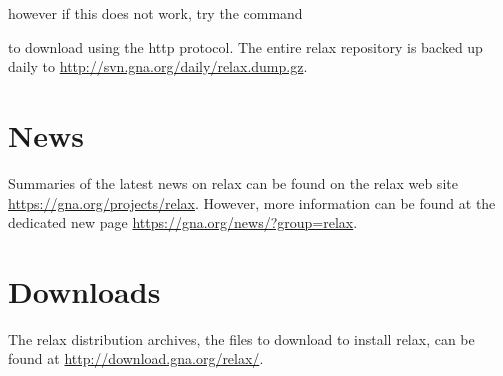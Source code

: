 however if this does not work, try the command


to download using the http protocol.  The entire relax repository is backed up daily to \href{http://svn.gna.org/daily/relax.dump.gz}{http://svn.gna.org/daily/relax.dump.gz}.




\section{News}

Summaries of the latest news on relax can be found on the relax web site \href{https://gna.org/projects/relax}{https://gna.org/projects/relax}.  However, more information can be found at the dedicated new page \href{https://gna.org/news/?group=relax}{https://gna.org/news/?group=relax}.




\section{Downloads}

The relax distribution archives, the files to download to install relax, can be found at \href{http://download.gna.org/relax/}{http://download.gna.org/relax/}.
